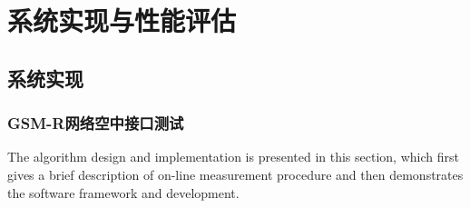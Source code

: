 

\chapter{系统实现与性能评估}
\label{chap:system}

\section{系统实现}

\subsection{GSM-R网络空中接口测试}
\label{sec:um}

The algorithm design and implementation is presented in this section, which first gives a brief description of on-line measurement procedure and then demonstrates the software framework and development.

